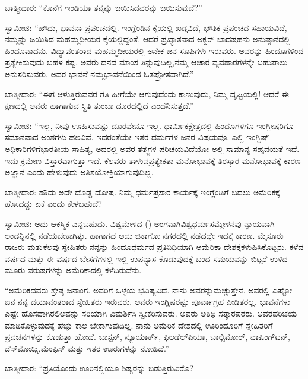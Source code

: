 ಬಾತ್ಮೀದಾರ: “ಕೊನೆಗೆ ಇಂಡಿಯಾ ತನ್ನನ್ನು ಜಯಿಸಿದವರನ್ನು ಜಯಿಸುವುದೆ?”

ಸ್ವಾಮೀಜಿ: “ಹೌದು, ಭಾವನಾ ಪ್ರಪಂಚದಲ್ಲಿ. ಇಂಗ್ಲೆಂಡಿನ ಕೈಯಲ್ಲಿ ಖಡ್ಗವಿದೆ, ಭೌತಿಕ ಪ್ರಪಂಚದ ಸಹಾಯವಿದೆ, ನಮ್ಮನ್ನು ಜಯಿಸಿದ ಮಹಮ್ಮದೀಯರ ಕೈಯಲ್ಲಿ\-ದ್ದಂತೆ. ಆದರೆ ಪ್ರಖ್ಯಾತನಾದ ಅಕ್ಬರ್​ ಬಾದಷಹನು ಅನುಷ್ಠಾನದಲ್ಲಿ ಹಿಂದೂವಾದನು. ವಿದ್ಯಾವಂತರಾದ ಮಹಮ್ಮದೀಯರಲ್ಲಿ ಅನೇಕ ಜನ ಸೂಫಿಗಳು ಇರುವರು. ಅವರನ್ನು ಹಿಂದೂಗಳಿಂದ ಪ್ರತ್ಯೇಕಿಸುವುದು ಬಹಳ ಕಷ್ಟ. ಅವರು ದನದ ಮಾಂಸ ತಿನ್ನುವುದಿಲ್ಲ,\break ನಮ್ಮ ಆಚಾರ ವ್ಯವಹಾರಗಳನ್ನೇ ಬಹುಪಾಲು ಅನುಸರಿಸುವರು. ಅವರ ಭಾವನೆ ನಮ್ಮ\break ಭಾವನೆಯಿಂದ ಓತಪ್ರೋತವಾಗಿದೆ.”

ಬಾತ್ಮೀದಾರ: “ಈಗ ಆಳುತ್ತಿರುವವರ ಗತಿ ಹೀಗೆಯೇ ಆಗುವುದೆಂದು ಕಾಣುವುದು, ನಿಮ್ಮ ದೃಷ್ಟಿಯಲ್ಲಿ! ಆದರೆ ಈ ಕ್ಷಣದಲ್ಲಿ ಅವರು ಹಾಗಾಗುವ ಸ್ಥಿತಿ ತುಂಬಾ ದೂರದಲ್ಲಿದೆ ಎಂದೆನಿಸುತ್ತದೆ.”

ಸ್ವಾಮೀಜಿ: “ಇಲ್ಲ, ನೀವು ಊಹಿಸುವಷ್ಟು ದೂರವೇನೂ ಇಲ್ಲ. ಧಾರ್ಮಿಕ\break ಕ್ಷೇತ್ರದಲ್ಲಿ ಹಿಂದೂಗಳಿಗೂ ಇಂಗ್ಲೀಷರಿಗೂ ಸಮಾನವಾದ ಅಂಶಗಳು ಹಲವಿವೆ. ಇದರಂತೆಯೇ ಇತರ ಧರ್ಮಗಳ ಜನರ ವಿಷಯವೂ. ಎಲ್ಲಿ ಇಂಗ್ಲಿಷ್​ ಅಧಿಕಾರಿಗಳಿಗೆ\break ಭಾರತೀಯ ಸಾಹಿತ್ಯ, ಅದರಲ್ಲಿ ಅವರ ತತ್ತ್ವಗಳ ಪರಿಚಯವಿದೆಯೋ ಅಲ್ಲಿ ಸಾಮಾನ್ಯ ಸಹೃದಯತೆ ಇದೆ. ಇದು ಕ್ರಮೇಣ ವಿಸ್ತಾರವಾಗುತ್ತಾ ಇದೆ. ಕೆಲವರು ತಾಳುವ\break ಪ್ರತ್ಯೇಕತಾ ಮನೋಭಾವಕ್ಕೆ ತಿರಸ್ಕಾರ ಮನೋಭಾವಕ್ಕೆ ಕಾರಣ ಅಜ್ಞಾನ ಎಂದು ಹೇಳುವುದು ಅತಿಶಯೋಕ್ತಿಯಾಗುವುದಿಲ್ಲ.

ಬಾತ್ಮೀದಾರ: ಹೌದು ಅದೇ ದೊಡ್ಡ ದೋಷ. ನಿಮ್ಮ ಧರ್ಮಪ್ರಸಾರ ಕಾರ್ಯಕ್ಕೆ ಇಂಗ್ಲೆಂಡಿಗೆ ಬದಲು ಅಮೆರಿಕಕ್ಕೆ ಹೋದದ್ದು ಏಕೆ ಎಂದು ಕೇಳಬಹುದೆ?

ಸ್ವಾಮೀಜಿ: ಅದು ಆಕಸ್ಮಿಕ ಎನ್ನಬಹುದು. ವಿಶ್ವಮೇಳದ () ಅಂಗವಾಗಿ\break ವಿಶ್ವಧರ್ಮಸಮ್ಮೇಳನವು ನ್ಯಾಯವಾಗಿ ಲಂಡನ್ನಿನಲ್ಲಿ ನಡೆಯಬೇಕಾಗಿತ್ತು. ಹಾಗಾಗದೆ ಅದು ಚಿಕಾಗೋ ನಗರದಲ್ಲಿ ನಡೆದದ್ದೇ ಇದಕ್ಕೆ ಕಾರಣ. ಮೈಸೂರು ರಾಜರು ಮತ್ತು\break ಕೆಲವು ಸ್ನೇಹಿತರು ನನ್ನನ್ನು ಹಿಂದೂಧರ್ಮದ ಪ್ರತಿನಿಧಿಯಾಗಿ ಅಮೆರಿಕಾ ದೇಶಕ್ಕೆ\break ಕಳುಹಿಸಿಕೊಟ್ಟರು. ಕಳೆದ ವರ್ಷದ ಮತ್ತು ಈ ವರ್ಷದ ಬೇಸಗೆಗಳಲ್ಲಿ ಇಲ್ಲಿ ಉಪನ್ಯಾಸ ಕೊಡುವುದಕ್ಕೆ ಬಂದ ಸಮಯವನ್ನು ಬಿಟ್ಟರೆ ಉಳಿದ ಮೂರು ವರುಷಗಳನ್ನು ಅಮೆರಿಕಾದಲ್ಲಿ ಕಳೆದಿರುವೆನು.

\vskip 0.4cm

“ಅಮೆರಿಕದವರು ಶ್ರೇಷ್ಠ ಜನಾಂಗ. ಅವರಿಗೆ ಒಳ್ಳೆಯ ಭವಿಷ್ಯವಿದೆ. ನಾನು ಅವರನ್ನು\break ಮೆಚ್ಚುತ್ತೇನೆ. ಅವರಲ್ಲಿ ಎಷ್ಟೋ ಜನ ನನ್ನ ದಯಾವಂತರಾದ ಸ್ನೇಹಿತರು ಇರುವರು. ಅವರು ಇಂಗ್ಲಿಷರಷ್ಟು ಪೂರ್ವಾಗ್ರಹ ಪೀಡಿತರಲ್ಲ. ಭಾವನೆಗಳು ಎಷ್ಟೇ ಹೊಸದಾಗಿರಲಿ\break ಅವನ್ನು ಸರಿಯಾಗಿ ವಿಮರ್ಶಿಸಿ ಸ್ವೀಕರಿಸುವರು. ಅವರು ಅತಿಥಿ ಸತ್ಕಾರಪರರು. ಅವರ\break ಪರಿಚಯ ಮಾಡಿಕೊಳ್ಳುವುದಕ್ಕೆ ಹೆಚ್ಚು ಕಾಲ ಬೇಕಾಗುವುದಿಲ್ಲ. ನಾನು ಅಮೆರಿಕ ದೇಶದಲ್ಲಿ ಊರಿಂದೂರಿಗೆ ಸ್ನೇಹಿತರಿಗೆ ಪ್ರವಚನಗಳನ್ನು ಕೊಡುತ್ತಾ ಹೋದೆ. ಬಾಸ್ಟನ್​, ನ್ಯೂಯಾರ್ಕ್​, ಫಿಲಡೆಲ್​ಪಿಯಾ, ಬಾಲ್ಟಿಮೋರ್​, ವಾಷಿಂಗ್​ಟನ್​, ಡೆಸ್​ಮೊಯ್ನಿ,\break ಮೆಂಫಿಸ್​ ಮತ್ತು ಇತರ ಊರುಗಳನ್ನು ನೋಡಿದೆ.”

\vskip 0.4cm

ಬಾತ್ಮೀದಾರ: “ಪ್ರತಿಯೊಂದು ಊರಿನಲ್ಲಿಯೂ ಶಿಷ್ಯರನ್ನು ಬಿಡುತ್ತಿರುವಿರೊ?

\vskip 0.4cm

